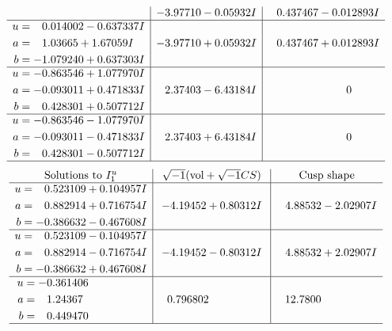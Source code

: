 \documentclass[1p]{elsarticle_modified}
\theoremstyle{definition}
\newcommand{\I}{\sqrt{-1}}
\begin{document}
$$\begin{array}{c|c|c}
 & -3.97710 - 0.05932 I & \phantom{-}0.437467 - 0.012893 I \\ \hline\begin{aligned}
u &= \phantom{-}0.014002 - 0.637337 I \\
a &= \phantom{-}1.03665 + 1.67059 I \\
b &= -1.079240 + 0.637303 I\end{aligned}
 & -3.97710 + 0.05932 I & \phantom{-}0.437467 + 0.012893 I \\ \hline\begin{aligned}
u &= -0.863546 + 1.077970 I \\
a &= -0.093011 + 0.471833 I \\
b &= \phantom{-}0.428301 + 0.507712 I\end{aligned}
 & \phantom{-}2.37403 - 6.43184 I & \phantom{-0.000000 } 0 \\ \hline\begin{aligned}
u &= -0.863546 - 1.077970 I \\
a &= -0.093011 - 0.471833 I \\
b &= \phantom{-}0.428301 - 0.507712 I\end{aligned}
 & \phantom{-}2.37403 + 6.43184 I & \phantom{-0.000000 } 0\\
 \hline 
 \end{array}$$\newpage$$\begin{array}{c|c|c}  
\text{Solutions to }I^u_{1}& \I (\text{vol} + \sqrt{-1}CS) & \text{Cusp shape}\\
 \hline 
\begin{aligned}
u &= \phantom{-}0.523109 + 0.104957 I \\
a &= \phantom{-}0.882914 + 0.716754 I \\
b &= -0.386632 - 0.467608 I\end{aligned}
 & -4.19452 + 0.80312 I & \phantom{-}4.88532 - 2.02907 I \\ \hline\begin{aligned}
u &= \phantom{-}0.523109 - 0.104957 I \\
a &= \phantom{-}0.882914 - 0.716754 I \\
b &= -0.386632 + 0.467608 I\end{aligned}
 & -4.19452 - 0.80312 I & \phantom{-}4.88532 + 2.02907 I \\ \hline\begin{aligned}
u &= -0.361406\phantom{ +0.000000I} \\
a &= \phantom{-}1.24367\phantom{ +0.000000I} \\
b &= \phantom{-}0.449470\phantom{ +0.000000I}\end{aligned}
 & \phantom{-}0.796802\phantom{ +0.000000I} & \phantom{-}12.7800\phantom{ +0.000000I}\\
 \hline 
 \end{array}$$\newpage\newpage\renewcommand{\arraystretch}{1}
\end{document}
